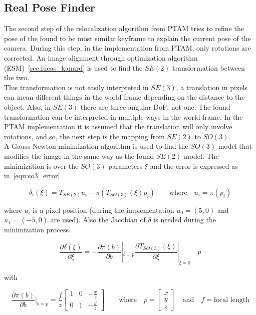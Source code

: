 \subsection{Real Pose Finder}
\label{sub:real_pose_finder}

The second step of the relocalization algorithm from PTAM tries to refine the pose of the found to be most similar keyframe to explain the current pose of the camera. During this step, in the implementation from PTAM, only rotations are corrected. An image alignment through optimization algorithm (ESM)~\ref{sec:lucas_kanard} is used to find the $SE(2)$ transformation between the two.\\

This transformation is not easily interpreted in $SE(3)$, a translation in pixels can mean different things in the world frame depending on the distance to the object. Also, in $SE(3)$ there are three angular DoF, not one. The found transformation can be interpreted in multiple ways in the world frame. In the PTAM implementation it is assumed that the translation will only involve rotations, and so, the next step is the mapping from $SE(2)$ to $SO(3)$.\\

A Gauss-Newton minimization algorithm is used to find the $SO(3)$ model that modifies the image in the same way as the found $SE(2)$ model. The minimization is over the $SO(3)$ parameters $\xi$ and the error is expressed as in~\ref{equ:so3_error}

\begin{equation}
  \delta_i(\xi) = T_{SE(2)}u_i - \pi(T_{SO(3)}(\xi) p_i) \qquad \text{where} \quad u_i = \pi(p_i)
  \label{equ:so3_error}
\end{equation}


where $u_i$ is a pixel position (during the implementation $u_0=(5,0)$ and $u_1=(-5,0)$ are used). Also the Jacobian of $\delta$ is needed during the minimization process.

\begin{equation}
  \frac{\partial \delta(\xi)}{\partial \xi} = -\frac{\partial \pi (b)}{\partial b}|_{b=p} \frac{\partial T_{SO(3)}(\xi)}{\partial\xi}|_{\xi=0} \quad p
\end{equation}

with

\begin{equation}
  \frac{\partial \pi(b)}{\partial b} |_{b=p} = \frac{f}{z}
  \begin{bmatrix}
    1 & 0 & -\frac{x}{z} \\
    0 & 1 & -\frac{y}{z}
  \end{bmatrix}
  \qquad \text{where} \quad 
  p = \begin{bmatrix} x \\ y \\ z \end{bmatrix} \quad \text{and} \quad f = \text{focal length}
\end{equation}

